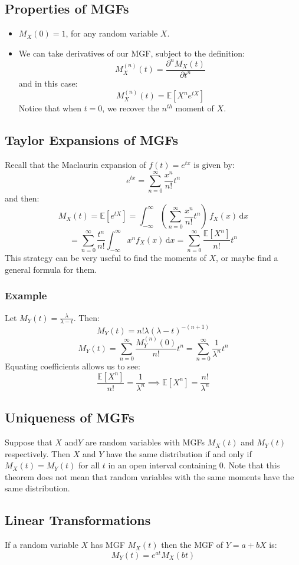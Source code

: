 \documentclass[12pt]{article}
\newcommand{\pf}[2]{\frac{\partial #1}{\partial #2}}
\begin{document}
\subsection{Properties of MGFs}
\begin{itemize}
    \item \(M_X(0)=1\), for any random variable \(X\).
    \item We can take derivatives of our MGF, subject to the definition:
    \[M_X^{(n)}(t)=\pf{^nM_X(t)}{t^n}\]
    and in this case:
    \[M_X^{(n)}(t)=\mathbb{E}[X^ne^{tX}]\]
    Notice that when \(t=0\), we recover the \(n^{th}\) moment of \(X\).
\end{itemize}
\subsection{Taylor Expansions of MGFs}
Recall that the Maclaurin expansion of \(f(t)=e^{tx}\) is given by:
\[e^{tx}=\sum^\infty_{n=0}\frac{x^n}{n!}t^n\]
and then:
\[M_X(t)=\mathbb{E}[e^{tX}]=\int^\infty_{-\infty}\left(\sum^\infty_{n=0}\frac{x^n}{n!}t^n\right)\, f_X(x)\,\text{d}x\]
\[=\sum^\infty_{n=0}\frac{t^n}{n!}\int^\infty_{-\infty}x^nf_X(x)\,\text{d}x=\sum^\infty_{n=0}\frac{\mathbb{E}[X^n]}{n!}t^n\]
This strategy can be very useful to find the moments of \(X\), or maybe find a general formula for them.
\subsubsection*{Example}
Let \(M_Y(t)=\frac{\lambda}{\lambda - t}\). Then:
\[M_Y(t)=n!\lambda(\lambda-t)^{-(n+1)}\]
\[M_Y(t)=\sum^\infty_{n=0}\frac{M_Y^{(n)}(0)}{n!}t^n=\sum^\infty_{n=0}\frac{1}{\lambda^n}t^n\]
Equating coefficients allows us to see:
\[\frac{\mathbb{E}[X^n]}{n!}=\frac{1}{\lambda^n}\implies \mathbb{E}[X^n]=\frac{n!}{\lambda^n}\]
\subsection{Uniqueness of MGFs}
Suppose that \(X\) and\(Y\) are random variables with MGFs \(M_X(t)\) and \(M_Y(t)\) respectively. Then \(X\) and \(Y\) have the same distribution if and only if \(M_X(t)=M_Y(t)\) for all \(t\) in an open interval containing 0. Note that this theorem does not mean that random variables with the same moments have the same distribution.
\subsection{Linear Transformations}
If a random variable \(X\) has MGF \(M_X(t)\) then the MGF of \(Y=a+bX\) is:
\[M_Y(t)=e^{at}M_X(bt)\]
\end{document}
